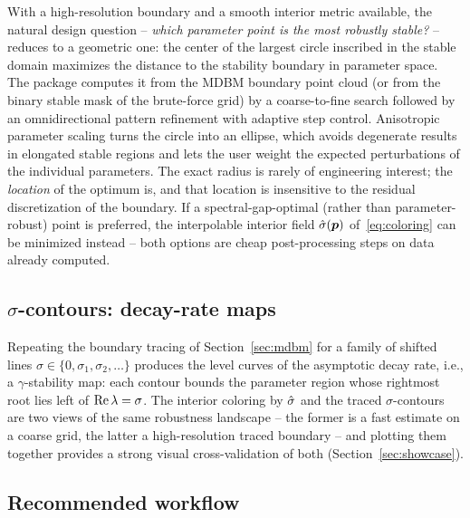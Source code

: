 With a high-resolution boundary and a smooth interior metric available, the
natural design question -- \emph{which parameter point is the most robustly
stable?} -- reduces to a geometric one: the center of the largest circle
inscribed in the stable domain maximizes the distance to the stability
boundary in parameter space. The package computes it from the MDBM boundary
point cloud (or from the binary stable mask of the brute-force grid) by a
coarse-to-fine search followed by an omnidirectional pattern refinement with
adaptive step control. Anisotropic parameter scaling turns the circle into
an ellipse, which avoids degenerate results in elongated stable regions and
lets the user weight the expected perturbations of the individual
parameters. The exact radius is rarely of engineering interest; the
\emph{location} of the optimum is, and that location is insensitive to the
residual discretization of the boundary. If a spectral-gap-optimal (rather
than parameter-robust) point is preferred, the interpolable interior field
$\hat{\sigma}(\boldsymbol{p})$ of~\eqref{eq:coloring} can be minimized instead -- both
options are cheap post-processing steps on data already computed.

\subsection{\texorpdfstring{$\sigma$}{sigma}-contours: decay-rate maps}\label{sec:sigmacontours}

Repeating the boundary tracing of Section~\ref{sec:mdbm} for a family of
shifted lines $\sigma\in\{0,\sigma_1,\sigma_2,\dots\}$ produces the level
curves of the asymptotic decay rate, i.e., a $\gamma$-stability map: each
contour bounds the parameter region whose rightmost root lies left of
$\operatorname{Re}\lambda=\sigma$. The interior coloring by $\hat{\sigma}$ and the traced
$\sigma$-contours are two views of the same robustness landscape -- the
former is a fast estimate on a coarse grid, the latter a high-resolution
traced boundary -- and plotting them together provides a strong visual
cross-validation of both (Section~\ref{sec:showcase}).

\subsection{Recommended workflow}\label{sec:workflow}

